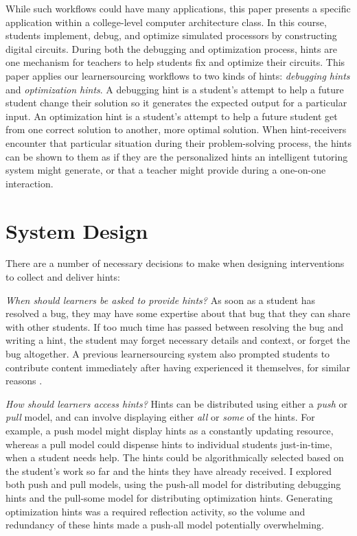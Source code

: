 While such workflows could have many applications, this paper presents a specific application within a college-level computer architecture class. In this course, students implement, debug, and optimize simulated processors by constructing digital circuits. During both the debugging and optimization process, hints are one mechanism for teachers to help students fix and optimize their circuits. This paper applies our learnersourcing workflows to two kinds of hints: \textit{debugging hints} and \textit{optimization hints}. A debugging hint is a student's attempt to help a future student change their solution so it generates the expected output for a particular input. An optimization hint is a student's attempt to help a future student get from one correct solution to another, more optimal solution. When hint-receivers encounter that particular situation during their problem-solving process, the hints can be shown to them as if they are the personalized hints an intelligent tutoring system might generate, or that a teacher might provide during a one-on-one interaction. 

\section{System Design}
There are a number of necessary decisions to make when designing interventions to collect and deliver hints:

{\it When should learners be asked to provide hints?} As soon as a student has resolved a bug, they may have some expertise about that bug that they can share with other students. If too much time has passed between resolving the bug and writing a hint, the student may forget necessary details and context, or forget the bug altogether. A previous learnersourcing system also prompted students to contribute content immediately after having experienced it themselves, for similar reasons \cite{weir2015}.

{\it How should learners access hints?} Hints can be distributed using either a \textit{push} or \textit{pull} model, and can involve displaying either \textit{all} or \textit{some} of the hints. For example, a push model might display hints as a constantly updating resource, whereas a pull model could dispense hints to individual students just-in-time, when a student needs help. The hints could be algorithmically selected based on the student's work so far and the hints they have already received. I explored both push and pull models, using the push-all model for distributing debugging hints and the pull-some model for distributing optimization hints. Generating optimization hints was a required reflection activity, so the volume and redundancy of these hints made a push-all model potentially overwhelming.

